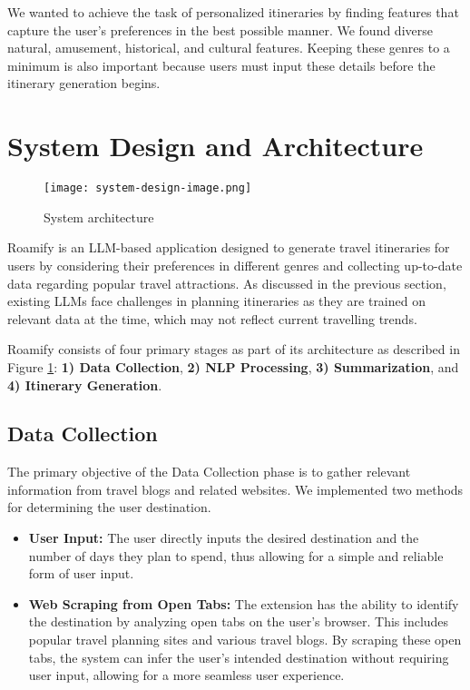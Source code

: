 \documentclass[final,3p,times,authoryear]{elsarticle}
\begin{document}
    We wanted to achieve the task of personalized itineraries by finding features that capture the user's preferences in the best possible manner. We found diverse natural, amusement, historical, and cultural features. Keeping these genres to a minimum is also important because users must input these details before the itinerary generation begins.

\vspace{-7pt}

\section{System Design and Architecture}
    
    \begin{figure}[h!]
        \centering
        \texttt{[image: system-design-image.png]}
        \caption{System architecture}
        \label{fig:system-design}
    \end{figure}
    
    Roamify is an LLM-based application designed to generate travel itineraries for users by considering their preferences in different genres and collecting up-to-date data regarding popular travel attractions. As discussed in the previous section, existing LLMs face challenges in planning itineraries as they are trained on relevant data at the time, which may not reflect current travelling trends.
    
    Roamify consists of four primary stages as part of its architecture as described in Figure \ref{fig:system-design}: \textbf{1) Data Collection}, \textbf{2) NLP Processing}, \textbf{3) Summarization}, and \textbf{4) Itinerary Generation}.
    
    \vspace{-7pt}
    
    \subsection{Data Collection}
        The primary objective of the Data Collection phase is to gather relevant information from travel blogs and related websites. We implemented two methods for determining the user destination.
        
        \begin{itemize}
            \item \textbf{User Input:} The user directly inputs the desired destination and the number of days they plan to spend, thus allowing for a simple and reliable form of user input.
            
            \item \textbf{Web Scraping from Open Tabs:} The extension has
            the ability to identify the destination by analyzing open tabs on the user’s browser. This includes popular travel planning sites and various travel blogs. By scraping these open tabs, the system can infer the user’s intended destination without requiring user input, allowing for a more seamless user experience.
        \end{itemize}
        
\end{document}
